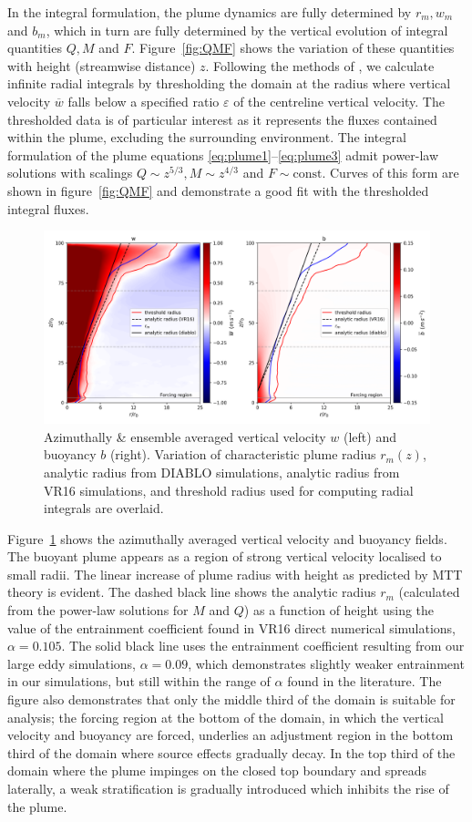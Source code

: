 \documentclass[a4paper]{article}
\begin{document}
In the integral formulation, the plume dynamics are fully determined by $r_m, w_m$ and $b_m$, which in turn
are fully determined by the vertical evolution of integral quantities $Q, M$ and $F$. Figure~\ref{fig:QMF}
shows the variation of these quantities with height (streamwise distance) $z$. Following the methods of
\citet{craske}, we calculate infinite radial integrals by thresholding the domain at the radius where vertical
velocity $\overline{w}$ falls below a specified ratio $\varepsilon$ of the centreline vertical velocity. The
thresholded data is of particular interest as it represents the fluxes contained within the plume, excluding
the surrounding environment. The integral formulation of the plume equations
\eqref{eq:plume1}--\eqref{eq:plume3} admit power-law solutions with scalings $Q \sim z^{5/3}, M \sim z^{4/3}$
and $F \sim \text{const}$. Curves of this form are shown in figure~\ref{fig:QMF} and demonstrate a good fit
with the thresholded integral fluxes. 
\begin{figure}
	\centering
	\includegraphics[width=.8\textwidth]{mvr/fig7.png}
	\caption{Azimuthally \& ensemble averaged vertical velocity $w$ (left) and buoyancy $b$ (right). Variation
	of characteristic plume radius $r_m(z)$, analytic radius from DIABLO simulations, analytic radius from
	VR16 simulations, and threshold radius used for computing radial integrals are overlaid.}
	\label{fig:radius}
\end{figure}

Figure~\ref{fig:radius} shows the azimuthally averaged vertical velocity and buoyancy fields. The
buoyant plume appears as a region of strong vertical velocity localised to small radii. The linear increase
of plume radius with height as predicted by MTT theory is evident. The dashed black line shows the
analytic radius $r_m$ (calculated from the power-law solutions for $M$ and $Q$) as a function of height using
the value of the entrainment coefficient found in VR16 direct numerical simulations, $\alpha = 0.105$. The
solid black line uses the entrainment coefficient resulting from our large eddy simulations, $\alpha = 0.09$,
which demonstrates slightly weaker entrainment in our simulations, but still within the range of $\alpha$
found in the literature. The figure also demonstrates that only the middle third of the domain is suitable for
analysis; the forcing region at the bottom of the domain, in which the vertical velocity and buoyancy are
forced, underlies an adjustment region in the bottom third of the domain where source effects gradually decay.
In the top third of the domain where the plume impinges on the closed top boundary and spreads laterally, a
weak stratification is gradually introduced which inhibits the rise of the plume.
\end{document}
